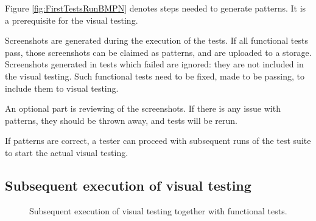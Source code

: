 \documentclass[11pt,oneside,final]{fithesis2}
\begin{document}
  \newpage
  Figure \ref{fig:FirstTestsRunBMPN} denotes steps needed to generate patterns. It is a prerequisite for the visual testing.
  
  Screenshots are generated during the execution of the tests. If all functional tests pass, those screenshots
  can be claimed as patterns, and are uploaded to a storage. Screenshots generated in tests which failed are ignored: they are
  not included in the visual testing. Such functional tests need to be fixed, made to be passing, to include them to visual testing.
  
  An optional part is reviewing of the screenshots. If there is any issue with patterns, they should be thrown away, and tests will be rerun.
  
  If patterns are correct, a tester can proceed with subsequent runs of the test suite to start the actual visual testing.
  
  \subsection{Subsequent execution of visual testing}
  
  \begin{figure}[h!]
    \begin{center}
    \leavevmode
    \centerline{}
    \end{center}
    \caption{Subsequent execution of visual testing together with functional tests.}
    \label{fig:NextTestsRunsBMPN}
  \end{figure}
  
\end{document}
